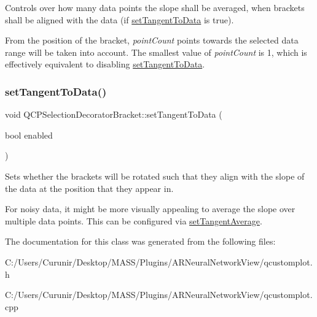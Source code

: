 Controls over how many data points the slope shall be averaged, when brackets shall be aligned with the data (if \hyperlink{class_q_c_p_selection_decorator_bracket_a93bc6086e53a5e40a08641a7b2e2cdd5}{set\+Tangent\+To\+Data} is true).

From the position of the bracket, {\itshape point\+Count} points towards the selected data range will be taken into account. The smallest value of {\itshape point\+Count} is 1, which is effectively equivalent to disabling \hyperlink{class_q_c_p_selection_decorator_bracket_a93bc6086e53a5e40a08641a7b2e2cdd5}{set\+Tangent\+To\+Data}. \mbox{\label{class_q_c_p_selection_decorator_bracket_a93bc6086e53a5e40a08641a7b2e2cdd5}} 
\subsubsection{\texorpdfstring{set\+Tangent\+To\+Data()}{setTangentToData()}}
{\footnotesize\ttfamily void Q\+C\+P\+Selection\+Decorator\+Bracket\+::set\+Tangent\+To\+Data (\begin{DoxyParamCaption}\item[{bool}]{enabled }\end{DoxyParamCaption})}

Sets whether the brackets will be rotated such that they align with the slope of the data at the position that they appear in.

For noisy data, it might be more visually appealing to average the slope over multiple data points. This can be configured via \hyperlink{class_q_c_p_selection_decorator_bracket_adb2d0876f25a77c88042b70818f1d6e4}{set\+Tangent\+Average}. 

The documentation for this class was generated from the following files\+:\begin{DoxyCompactItemize}
\item 
C\+:/\+Users/\+Curunir/\+Desktop/\+M\+A\+S\+S/\+Plugins/\+A\+R\+Neural\+Network\+View/qcustomplot.\+h\item 
C\+:/\+Users/\+Curunir/\+Desktop/\+M\+A\+S\+S/\+Plugins/\+A\+R\+Neural\+Network\+View/qcustomplot.\+cpp\end{DoxyCompactItemize}
